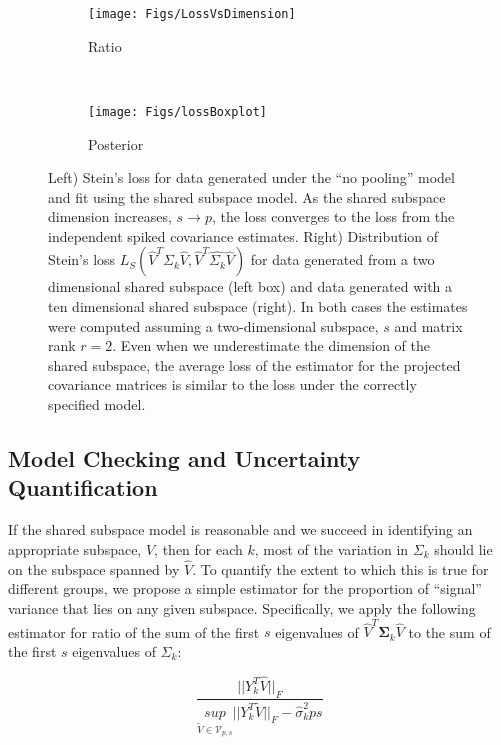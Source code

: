\documentclass{article}
\newcommand{\bl}[1]{{\mathbf #1}}
\begin{document}
\begin{figure}[t]
    \centering
    \begin{subfigure}[b]{0.45\textwidth}
        \texttt{[image: Figs/LossVsDimension]}
        \caption{Ratio}
        \label{fig:sdimension}
    \end{subfigure}
    ~ %
    \begin{subfigure}[b]{0.45\textwidth}
        \texttt{[image: Figs/lossBoxplot]}
        \caption{Posterior}
        \label{fig:lossBoxplot}
    \end{subfigure}
    \caption{Left) Stein's loss for data generated under the ``no
      pooling'' model and fit using the shared subspace model.  As the
      shared subspace dimension increases, $s \rightarrow p$, the loss
      converges to the loss from the independent spiked covariance
      estimates. Right) Distribution of Stein's loss
      $L_S(\hat{V}^T\Sigma_k\hat{V}, \hat{V}^T\hat{\Sigma_k}\hat{V})$
      for data generated from a two dimensional shared subspace (left
      box) and data generated with a ten dimensional shared subspace
      (right).  In both cases the estimates were computed assuming a
      two-dimensional subspace, $s$ and matrix rank $r=2$.  Even when
      we underestimate the dimension of the shared subspace, the
      average loss of the estimator for the projected covariance matrices is
      similar to the loss under the correctly specified model. }
\end{figure}


\subsection{Model Checking and Uncertainty Quantification}

If the shared subspace model is reasonable and we succeed in
identifying an appropriate subspace, $\hat{V}$, then for each $k$,
most of the variation in $\Sigma_k$ should lie on the subspace spanned
by $\hat{V}$.  To quantify the extent to which this is true for
different groups, we propose a simple estimator for the proportion of
``signal'' variance that lies on any given subspace.  Specifically, we
apply the following estimator for ratio of the sum of the first $s$ eigenvalues
of $\hat{V}^T\bl \Sigma_k \hat{V}$ to the sum of the first $s$
eigenvalues of $\Sigma_k$:

\begin{equation}
 \frac{||Y_k^T\hat{V}||_F}{\underset{\widetilde{V} \in \mathcal{V}_{p, s}}{sup}
  ||Y_k^T\widetilde{V}||_F - \hat{\sigma}_k^2ps}
\label{eqn:ratio}
\end{equation}
\end{document}
